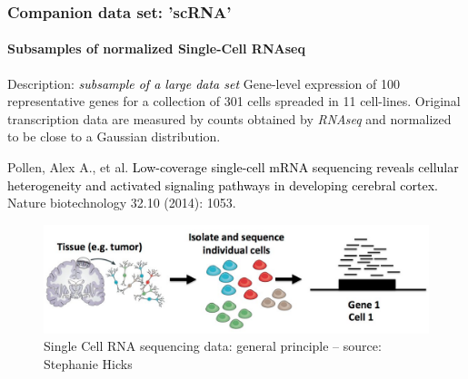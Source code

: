 \documentclass{beamer}\usepackage[]{graphicx}\usepackage[]{color}
\begin{document}
% 
% 


\begin{frame}[fragile]
  \frametitle{Companion data set: 'scRNA'}
  \framesubtitle{Subsamples of normalized Single-Cell RNAseq}

\begin{block}{Description: \textcolor{black}{\it subsample of a large data set}}
\small Gene-level expression of 100 representative genes for a collection of 301 cells 
spreaded in 11 cell-lines. Original transcription data are measured by counts obtained by 
\textit{RNAseq} and normalized to be close to a Gaussian distribution.\\

\begin{scriptsize}
\begin{thebibliography}{9}
 Pollen, Alex A., et al. \textcolor{black}{Low-coverage single-cell mRNA sequencing reveals cellular heterogeneity and activated signaling pathways in developing cerebral cortex.} \newblock Nature biotechnology 32.10 (2014): 1053.
\end{thebibliography}
\end{scriptsize}
\end{block}

\begin{figure}
  \includegraphics[width=.9\textwidth]{figures/scRNA-overview}
  \caption{Single Cell RNA sequencing data: general principle -- {\tiny source: Stephanie Hicks}}
\end{figure}

\end{frame}
\end{document}
